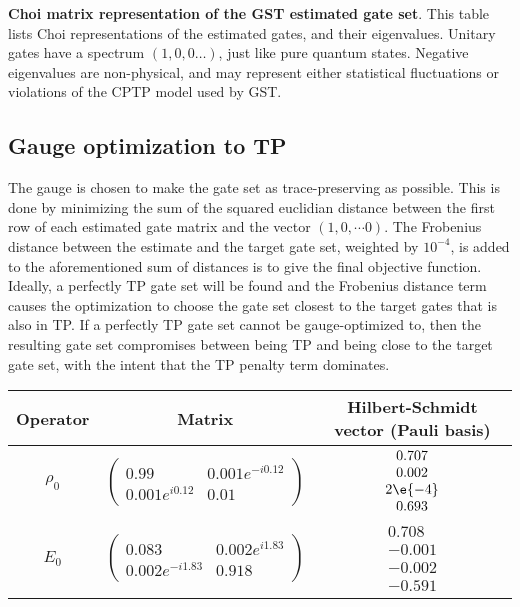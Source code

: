 {\begin{table}[h]
\begin{center}
\caption{\textbf{Choi matrix representation of the GST estimated gate set}.  This table lists Choi representations of the estimated gates, and their eigenvalues.  Unitary gates have a spectrum $(1,0,0\ldots)$, just like pure quantum states.  Negative eigenvalues are non-physical, and may represent either statistical fluctuations or violations of the CPTP model used by GST.\label{bestTargetGatesGatesetChoiTable}}
\end{center}
\end{table}

\clearpage

\subsection{Gauge optimization to TP}
The gauge is chosen to make the gate set as trace-preserving as possible.  This is done by minimizing the sum of the squared euclidian distance between the first row of each estimated gate matrix and the vector $(1,0,\cdots 0)$.  The Frobenius distance between the estimate and the target gate set, weighted by $10^{-4}$, is added to the aforementioned sum of distances is to give the final objective function.  Ideally, a perfectly TP gate set will be found and the Frobenius distance term causes the optimization to choose the gate set closest to the target gates that is also in TP.  If a perfectly TP gate set cannot be gauge-optimized to, then the resulting gate set compromises between being TP and being close to the target gate set, with the intent that the TP penalty term dominates.

\begin{table}[h]
\begin{center}
\begin{tabular}[l]{|c|c|c|}
\hline
Operator & Matrix & Hilbert-Schmidt vector (Pauli basis) \\ \hline
$\rho_{0}$ & $ \left(\!\!\begin{array}{cc}
0.99 & 0.001e^{-i0.12} \\ 
0.001e^{i0.12} & 0.01
 \end{array}\!\!\right) $
 & $ \begin{array}{c}
0.707 \\ 
0.002 \\ 
2\e{-4} \\ 
0.693
 \end{array} $
 \\ \hline
$E_{0}$ & $ \left(\!\!\begin{array}{cc}
0.083 & 0.002e^{i1.83} \\ 
0.002e^{-i1.83} & 0.918
 \end{array}\!\!\right) $
 & $ \begin{array}{c}
0.708 \\ 
-0.001 \\ 
-0.002 \\ 
-0.591
 \end{array} $
 \\ \hline
\end{tabular}


\end{center}
\end{table}}

